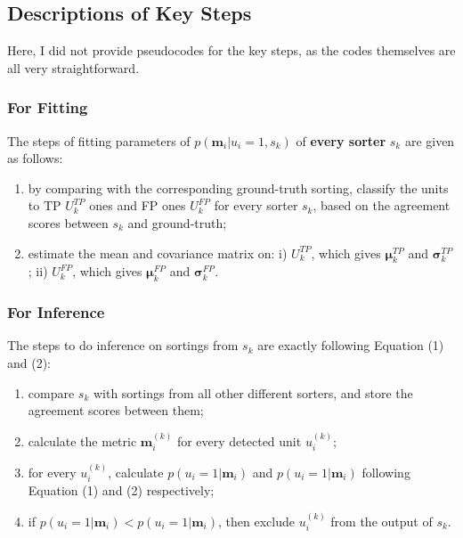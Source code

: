 \documentclass[12pt]{article}
\begin{document}
\subsection{Descriptions of Key Steps}
\label{ssec:descriptions}

Here, I did not provide pseudocodes for the key steps, as the codes themselves are all very straightforward.

\subsubsection{For Fitting}
\label{ssec:fit_pseudocode}

The steps of fitting parameters of $p(\mathbf{m}_i | u_i=1, s_k)$ of \textbf{every sorter} $s_k$ are given as follows:

\begin{enumerate}
    \item by comparing with the corresponding ground-truth sorting, classify the units to TP $U_k^{TP}$ ones and FP ones $U_k^{FP}$ for every sorter $s_k$, based on the agreement scores between $s_k$ and ground-truth;
    \item estimate the mean and covariance matrix on: i) $U_k^{TP}$, which gives $\mathbf{\mu}_k^{TP}$ and  $\mathbf{\sigma}_k^{TP}$; ii)  $U_k^{FP}$, which gives $\mathbf{\mu}_k^{FP}$ and  $\mathbf{\sigma}_k^{FP}$.
\end{enumerate}

\subsubsection{For Inference}
\label{ssec:fit_inference}

The steps to do inference on sortings from $s_k$ are exactly following Equation (1) and (2):

\begin{enumerate}
    \item compare $s_k$ with sortings from all other different sorters, and store the agreement scores between them;
    \item calculate the metric $\mathbf{m}_i^{(k)}$ for every detected unit $u_i^{(k)}$;
    \item for every $u_i^{(k)}$, calculate $p(u_i=1|\mathbf{m}_i)$ and $p(u_i=1|\mathbf{m}_i)$ following Equation (1) and (2) respectively;
    \item if $p(u_i=1|\mathbf{m}_i) < p(u_i=1|\mathbf{m}_i)$, then exclude $u_i^{(k)}$ from the output of $s_k$.
\end{enumerate}
\end{document}
